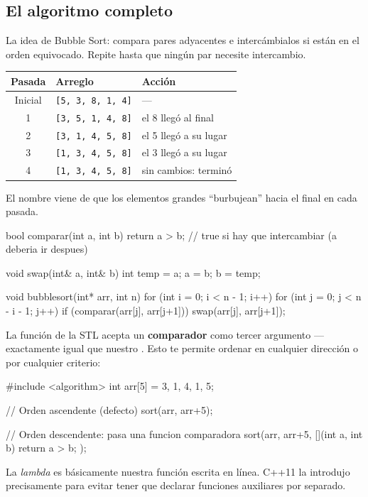 \documentclass[12pt, oneside]{article}
\begin{document}
\subsection{El algoritmo completo}

La idea de Bubble Sort: compara pares adyacentes e intercámbialos si están en
el orden equivocado. Repite hasta que ningún par necesite intercambio.

\begin{center}
\begin{tabular}{cll}
  \toprule
  \textbf{Pasada} & \textbf{Arreglo} & \textbf{Acción} \\
  \midrule
  Inicial & \texttt{[5, 3, 8, 1, 4]} & --- \\
  1       & \texttt{[3, 5, 1, 4, 8]} & el 8 llegó al final \\
  2       & \texttt{[3, 1, 4, 5, 8]} & el 5 llegó a su lugar \\
  3       & \texttt{[1, 3, 4, 5, 8]} & el 3 llegó a su lugar \\
  4       & \texttt{[1, 3, 4, 5, 8]} & sin cambios: terminó \\
  \bottomrule
\end{tabular}
\end{center}

El nombre viene de que los elementos grandes ``burbujean'' hacia el final en cada pasada.

\begin{codigo}[caption={Bubble Sort completo}]
bool comparar(int a, int b) {
    return a > b;   // true si hay que intercambiar (a deberia ir despues)
}

void swap(int& a, int& b) {
    int temp = a;  a = b;  b = temp;
}

void bubblesort(int* arr, int n) {
    for (int i = 0; i < n - 1; i++)
        for (int j = 0; j < n - i - 1; j++)
            if (comparar(arr[j], arr[j+1]))
                swap(arr[j], arr[j+1]);
}
\end{codigo}

\begin{tecnico}
  La función  de la STL acepta un \textbf{comparador} como
  tercer argumento — exactamente igual que nuestro . Esto te
  permite ordenar en cualquier dirección o por cualquier criterio:
  \begin{codigo}
  #include <algorithm>
  int arr[5] = {3, 1, 4, 1, 5};

  // Orden ascendente (defecto)
  sort(arr, arr+5);

  // Orden descendente: pasa una funcion comparadora
  sort(arr, arr+5, [](int a, int b){ return a > b; });
  \end{codigo}
  La \textit{lambda}  es básicamente
  nuestra función  escrita en línea. C++11 la introdujo
  precisamente para evitar tener que declarar funciones auxiliares por separado.
\end{tecnico}
\end{document}
